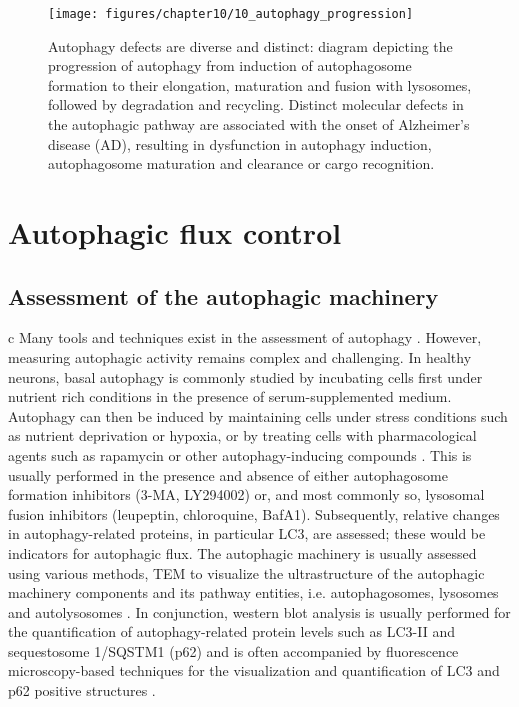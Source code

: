 \begin{figure}[!htbp]
  \texttt{[image: figures/chapter10/10\_autophagy\_progression]}
  \caption[Diverse and distinct autophagy defects]{Autophagy defects are diverse and distinct: diagram depicting the progression of autophagy from induction of autophagosome formation to their elongation, maturation and fusion with lysosomes, followed by degradation and recycling. Distinct molecular defects in the autophagic pathway are associated with the onset of Alzheimer’s disease (AD), resulting in dysfunction in autophagy induction, autophagosome maturation and clearance or cargo recognition.}
  \label{fig:10_autophagy_progression}
\end{figure}

\section{Autophagic flux control}
\subsection{Assessment of the autophagic machinery}c
Many tools and techniques exist in the assessment of autophagy \citep{klionsky2016}. However, measuring autophagic activity remains complex and challenging. In healthy neurons, basal autophagy is commonly studied by incubating cells first under nutrient rich conditions in the presence of serum-supplemented medium. Autophagy can then be induced by maintaining cells under stress conditions such as nutrient deprivation \citep{Alirezaei2010} or hypoxia, or by treating cells with pharmacological agents such as rapamycin or other autophagy-inducing compounds \citep{Boland2008,Rose2010}. This is usually performed in the presence and absence of either autophagosome formation inhibitors (3-MA, LY294002) or, and most commonly so, lysosomal fusion inhibitors (leupeptin, chloroquine, BafA1). Subsequently, relative changes in autophagy-related proteins, in particular LC3, are assessed; these would be indicators for autophagic flux. The autophagic machinery is usually assessed using various methods, TEM to visualize the ultrastructure of the autophagic machinery components and its pathway entities, i.e. autophagosomes, lysosomes and autolysosomes \citep{klionsky2016}. In conjunction, western blot analysis is usually performed for the quantification of autophagy-related protein levels such as LC3-II and sequestosome 1/SQSTM1 (p62) and is often accompanied by fluorescence microscopy-based techniques for the visualization and quantification of LC3 and p62 positive structures \citep{klionsky2016,Klionsky2012,Mizushima2007,Swanlund2010}.

